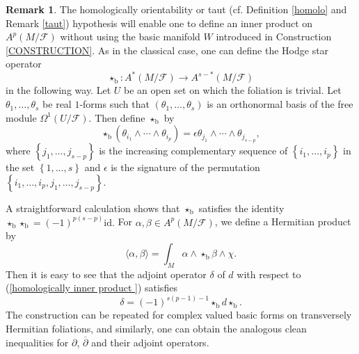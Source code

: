 \documentclass[12pt]{amsart}
\numberwithin{equation}{section}
\theoremstyle{definition}
\theoremstyle{definition}
\theoremstyle{definition}
\newtheorem{remark}  [theorem]     {Remark}
\renewcommand{\1}{\mathsf{1}}
\renewcommand{\>}{\rightarrow}
\newcommand{\bp}{\overline\partial}
\def\mc{\mathcal}
\theoremstyle{plain} %
\theoremstyle{plain} %
\theoremstyle{plain} %
\begin{document}
	\begin{remark}\label{homologic1}
		The homologically orientability or taut (cf. Definition \ref{homolo} and Remark \ref{taut}) hypothesis will enable one to  define an inner  product on $A^p(M/\mc F)$ without using the basic manifold $W$ introduced in Construction \ref{CONSTRUCTION}.  As in the classical case, one can define the Hodge star operator
		$$\star_\mathrm b:A^*(M/\mc F)\longrightarrow A^{s-*}(M/\mc F)$$
		in the following way. Let $U$ be an open set on which the foliation is trivial. Let $\theta_1,\ldots,\theta_s$ be real $1$-forms such that $\left(\theta_1,\ldots,\theta_s\right) $ is an orthonormal basis of the free module $\Omega^1(U/\mc F)$. Then define $\star_\mathrm b$ by
		$$\star_\mathrm b\left(\theta_{i_1}\wedge\cdots\wedge\theta_{i_p}\right)=\epsilon\theta_{j_1}\wedge\cdots\wedge\theta_{j_{s-p}},$$
		where $\left\{j_1,\ldots,j_{s-p}\right\}$ is the increasing complementary sequence of $\left\{i_1,\ldots,i_p\right\}$ in the set $\left\{1,\ldots,s\right\}$ and $\epsilon$ is the signature of the permutation $\left\{i_1,\ldots,i_p,j_1,\ldots,j_{s-p}\right\}.$ 
        
        A straightforward calculation shows that $\star_\mathrm b$ satisfies the identity $\star_\mathrm b\star_\mathrm b=(-1)^{p(s-p)}\text{id}.$
		For $\alpha,\beta\in A^p(M/\mc F)$, we define a Hermitian product by
		\begin{equation}\label{homologically inner product }
			\langle\alpha,\beta\rangle=\int_M\alpha\wedge{\star_\mathrm b\beta}\wedge\chi.
		\end{equation}
		Then it is easy to see that the adjoint operator $\delta$ of $d$ with respect to (\ref{homologically inner product })
		satisfies
		$$\delta={(-1)}^{s(p-1)-1}\star_\mathrm b d\star_\mathrm b.$$
		The construction can be repeated for complex valued basic forms on transversely Hermitian foliations, and similarly, one can obtain the 	analogous clean inequalities for $\partial$, $\bp$ and their adjoint operators.
	\end{remark}
	
\end{document}

